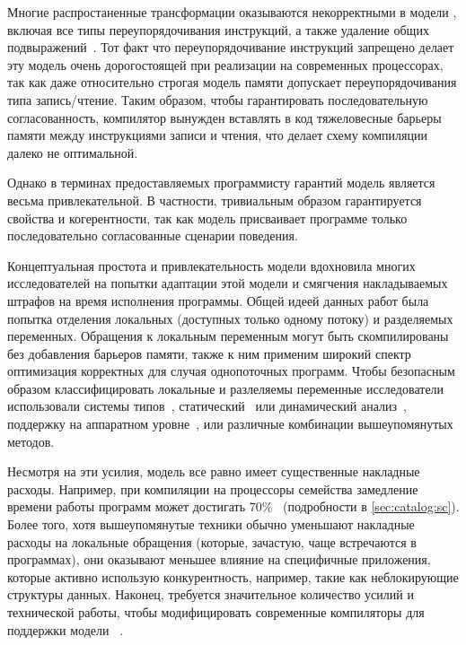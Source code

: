 Многие распростаненные трансформации оказываются 
некорректными в модели \SC, включая 
все типы переупорядочивания инструкций, 
а также удаление общих подвыражений~\cite{Marino-al:PLDI11, Sevcik-Aspinall:ECOOP08}.
Тот факт что переупорядочивание инструкций запрещено 
делает эту модель очень дорогостоящей при реализации
на современных процессорах, так как даже 
относительно строгая модель памяти \Intel
допускает переупорядочивания типа запись/чтение. 
Таким образом, чтобы гарантировать последовательную согласованность, 
компилятор вынужден вставлять в код тяжеловесные 
барьеры памяти между инструкциями записи и чтения,
что делает схему компиляции далеко не оптимальной. 

Однако в терминах предоставляемых программисту гарантий 
модель \SC является весьма привлекательной. 
В частности, тривиальным образом гарантируется свойства \DRF и когерентности, 
так как модель присваивает программе только 
последовательно согласованные сценарии поведения. 

Концептуальная простота и привлекательность модели \SC 
вдохновила многих исследователей на попытки 
адаптации этой модели и смягчения накладываемых 
штрафов на время исполнения программы. 
Общей идеей данных работ была попытка 
отделения локальных (доступных только одному потоку) 
и разделяемых переменных.
Обращения к локальным переменным могут быть скомпилированы 
без добавления барьеров памяти, также к ним 
применим широкий спектр оптимизация корректных 
для случая однопоточных программ. 
Чтобы безопасным образом классифицировать 
локальные и разлеляемы переменные исследователи 
использовали системы типов~\cite{Vollmer-al:PPoPP17},
статический~\cite{Singh-al:ISCA12} или динамический анализ~\cite{Liu-al:PLDI19}, 
поддержку на аппаратном уровне~\cite{Singh-al:ISCA12, Marino-al:PLDI10}, 
или различные комбинации вышеупомянутых методов.  

Несмотря на эти усилия, модель \SC все равно имеет существенные накладные расходы. 
Например, при компиляции на процессоры семейства 
замедление времени работы программ может достигать 70\%~\cite{Liu-al:PLDI19} 
(\see подробности в \cref{sec:catalog:sc}).
Более того, хотя вышеупомянутые техники обычно уменьшают 
накладные расходы на локальные обращения 
(которые, зачастую, чаще встречаются в программах),
они оказывают меньшее влияние на специфичные приложения, 
которые активно использую конкурентность, 
например, такие как неблокирующие структуры данных.
Наконец, требуется значительное количество усилий 
и технической работы, чтобы модифицировать 
современные компиляторы для поддержки модели \SC~\cite{Marino-al:PLDI11, Liu-al:PLDI19}.

